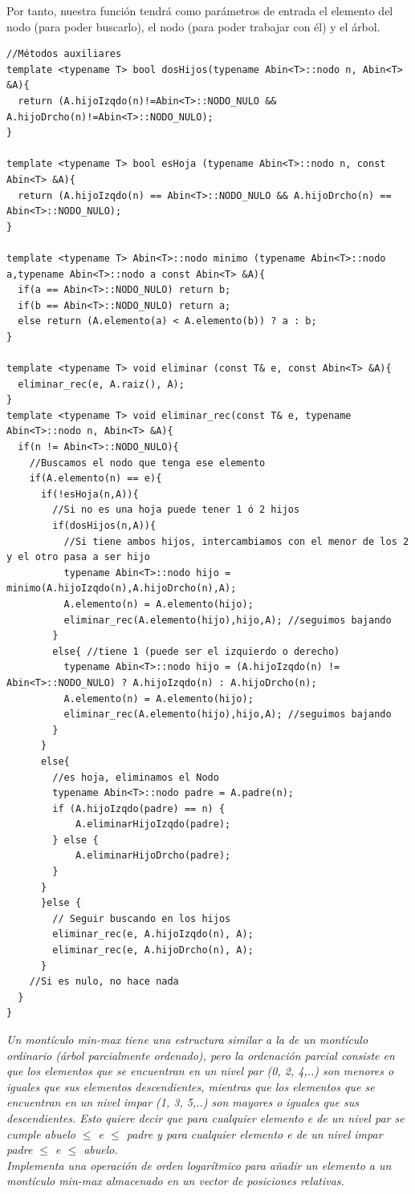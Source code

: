 Por tanto, nuestra función tendrá como parámetros de entrada el elemento del nodo (para poder buscarlo), el nodo (para poder trabajar con él) y el árbol.
\begin{verbatim}
//Métodos auxiliares
template <typename T> bool dosHijos(typename Abin<T>::nodo n, Abin<T> &A){
  return (A.hijoIzqdo(n)!=Abin<T>::NODO_NULO && A.hijoDrcho(n)!=Abin<T>::NODO_NULO);
}

template <typename T> bool esHoja (typename Abin<T>::nodo n, const Abin<T> &A){
  return (A.hijoIzqdo(n) == Abin<T>::NODO_NULO && A.hijoDrcho(n) == Abin<T>::NODO_NULO);
}

template <typename T> Abin<T>::nodo minimo (typename Abin<T>::nodo a,typename Abin<T>::nodo a const Abin<T> &A){
  if(a == Abin<T>::NODO_NULO) return b;
  if(b == Abin<T>::NODO_NULO) return a;
  else return (A.elemento(a) < A.elemento(b)) ? a : b;
}

template <typename T> void eliminar (const T& e, const Abin<T> &A){
  eliminar_rec(e, A.raiz(), A);
}
template <typename T> void eliminar_rec(const T& e, typename Abin<T>::nodo n, Abin<T> &A){
  if(n != Abin<T>::NODO_NULO){
    //Buscamos el nodo que tenga ese elemento
    if(A.elemento(n) == e){
      if(!esHoja(n,A)){
        //Si no es una hoja puede tener 1 ó 2 hijos
        if(dosHijos(n,A)){
          //Si tiene ambos hijos, intercambiamos con el menor de los 2 y el otro pasa a ser hijo
          typename Abin<T>::nodo hijo = minimo(A.hijoIzqdo(n),A.hijoDrcho(n),A);
          A.elemento(n) = A.elemento(hijo);
          eliminar_rec(A.elemento(hijo),hijo,A); //seguimos bajando
        }
        else{ //tiene 1 (puede ser el izquierdo o derecho)
          typename Abin<T>::nodo hijo = (A.hijoIzqdo(n) != Abin<T>::NODO_NULO) ? A.hijoIzqdo(n) : A.hijoDrcho(n);
          A.elemento(n) = A.elemento(hijo);
          eliminar_rec(A.elemento(hijo),hijo,A); //seguimos bajando
        }
      }
      else{
        //es hoja, eliminamos el Nodo
        typename Abin<T>::nodo padre = A.padre(n);
        if (A.hijoIzqdo(padre) == n) {
            A.eliminarHijoIzqdo(padre);
        } else {
            A.eliminarHijoDrcho(padre);
        }
      }
      }else {
        // Seguir buscando en los hijos
        eliminar_rec(e, A.hijoIzqdo(n), A);
        eliminar_rec(e, A.hijoDrcho(n), A);
      }
    //Si es nulo, no hace nada
  }
}

\end{verbatim}

\textbf{\large{}}\textit{ Un montículo min-max tiene una estructura similar a la de un montículo ordinario (árbol parcialmente ordenado), pero la ordenación parcial consiste en que los elementos que se encuentran en un nivel par (0, 2, 4,..) son menores o iguales que sus elementos descendientes, mientras que los elementos que se encuentran en un nivel impar (1, 3, 5,..) son mayores o iguales que sus descendientes. Esto quiere decir que para cualquier elemento e de un nivel par se cumple abuelo \(\leq\) e \(\leq\) padre y para cualquier elemento e de un nivel impar padre \(\leq\) e \(\leq\) abuelo.\\
Implementa una operación de orden logarítmico para añadir un elemento a un montículo min-max almacenado en un vector de posiciones relativas.}

